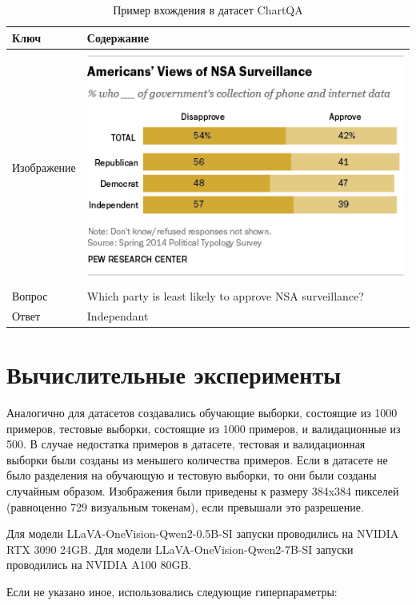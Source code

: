 \documentclass[LI,KR]{HSEUniversity}
\begin{document}
\begin{table}[H]
\centering
\begin{tabular}{| m{4cm} | m{12cm} |}
\hline
\textbf{Ключ} & \textbf{Содержание} \\ \hline
Изображение & \includegraphics[scale=0.6]{images/chartqa_example} \\ \hline
Вопрос & Which party is least likely to approve NSA surveillance? \\ \hline
Ответ & Independant \\ \hline
\end{tabular}
\caption{Пример вхождения в датасет ChartQA}
\end{table}

\chapter{Вычислительные эксперименты}

Аналогично \cite{mezo} для датасетов создавались обучающие выборки, состоящие из 1000 примеров, тестовые выборки, состоящие из 1000 примеров, и валидационные из 500.
В случае недостатка примеров в датасете, тестовая и валидационная выборки были созданы из меньшего количества примеров.
Если в датасете не было разделения на обучающую и тестовую выборки, то они были созданы случайным образом.
Изображения были приведены к размеру 384x384 пикселей (равноценно 729 визуальным токенам), если превышали это разрешение.

Для модели LLaVA-OneVision-Qwen2-0.5B-SI запуски проводились на NVIDIA RTX 3090 24GB.
Для модели LLaVA-OneVision-Qwen2-7B-SI запуски проводились на NVIDIA A100 80GB.

Если не указано иное, использовались следующие гиперпараметры:
\end{document}
